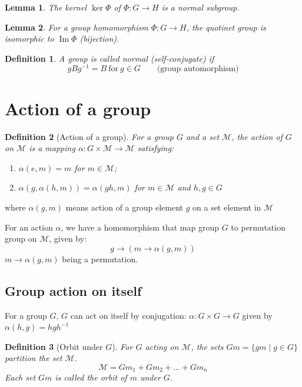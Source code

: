 \documentclass{amsart}
\newcommand{\setM}{\mathcal{M}}
\newtheorem{definition}{Definition}
\newtheorem{lemma}{Lemma}
\DeclareMathOperator{\Image}{Im}
\begin{document}
\begin{lemma}
    The kernel $\ker\Phi$ of $\Phi\colon G\to H$ is a normal subgroup.
\end{lemma}

\begin{lemma}
    For a group homomorphism $\Phi\colon G\to H$, the quotinet group is isomorphic to $\Image\Phi$ (bijection).
\end{lemma}


\begin{definition}
    A group is called normal (self-conjugate) if 
    \[
        gBg^{-1} = B\ \text{for}\ g \in G \qquad \text{(group automorphism)}    
    \]
\end{definition}

\section{Action of a group}

\begin{definition}
    [Action of a group]
    For a group $G$ and a set $\setM$, the action of $G$ on $\setM$ is a mapping 
    $\alpha\colon G\times \setM \to \setM$ satisfying:
    \begin{enumerate}
        \item $\alpha(e,m) = m$ for $m \in \setM$;
        \item $\alpha(g, \alpha(h,m)) = \alpha(gh, m)$ for $m\in \setM$ and $h,g\in G$
    \end{enumerate}
\end{definition}
where $\alpha(g,m)$ means action of a group element $g$ on a set element in $\setM$

For an action $\alpha$, we have a homomorphism that map group $G$ to permutation group on $\setM$, 
given by:
\[g\to (m\to \alpha(g,m))\]
$m\to \alpha(g,m)$ being a permutation. 

\subsection*{Group action on itself}
For a group $G$, $G$ can act on itself by conjugation: $\alpha\colon G\times G \to G$ given by
$\alpha(h,g) = hgh^{-1}$

\vspace{10pt}

\begin{definition}
    [Orbit under $G$]
    For $G$ acting on $\setM$, the sets $Gm = \{gm\mid g\in G\}$ partition the set $\setM$. 
    \[\setM = Gm_1 + Gm_2 + \dots + Gm_n\]
    Each set $Gm$ is called the orbit of $m$ under $G$.
\end{definition}
\end{document}
